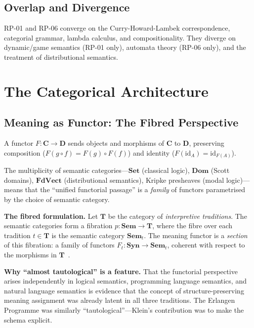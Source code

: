 \documentclass[12pt,a4paper]{article}
\begin{document}
\subsection{Overlap and Divergence}

RP-01 and RP-06 converge on the Curry-Howard-Lambek correspondence, categorial
grammar, lambda calculus, and compositionality. They diverge on dynamic/game
semantics (RP-01 only), automata theory (RP-06 only), and the treatment of
distributional semantics.

\section{The Categorical Architecture}

\subsection{Meaning as Functor: The Fibred Perspective}

A functor $F \colon \mathbf{C} \to \mathbf{D}$ sends objects and morphisms of
$\mathbf{C}$ to $\mathbf{D}$, preserving composition ($F(g \circ f) =
F(g) \circ F(f)$) and identity ($F(\mathrm{id}_A) = \mathrm{id}_{F(A)}$).

The multiplicity of semantic categories---$\mathbf{Set}$ (classical logic),
$\mathbf{Dom}$ (Scott domains), $\mathbf{FdVect}$ (distributional
semantics), Kripke presheaves (modal logic)---means that the ``unified
functorial passage'' is a \emph{family} of functors parametrised by the
choice of semantic category.

\textbf{The fibred formulation.} Let $\mathbf{T}$ be the category of
\emph{interpretive traditions}. The semantic categories form a fibration
$p \colon \mathbf{Sem} \to \mathbf{T}$, where the fibre over each tradition
$t \in \mathbf{T}$ is the semantic category $\mathbf{Sem}_t$. The meaning
functor is a \emph{section} of this fibration: a family of functors
$F_t \colon \mathbf{Syn} \to \mathbf{Sem}_t$, coherent with respect to the
morphisms in $\mathbf{T}$~\cite{Grothendieck1971,Jacobs1999}.

\textbf{Why ``almost tautological'' is a feature.} That the functorial
perspective arises independently in logical semantics, programming language
semantics, and natural language semantics is evidence that the concept of
structure-preserving meaning assignment was already latent in all three
traditions. The Erlangen Programme was similarly ``tautological''---Klein's
contribution was to make the schema explicit.
\end{document}
